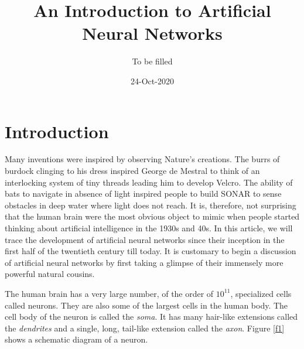 \documentclass{article}
\title{An Introduction to Artificial Neural Networks}
\author{To be filled}
\date{24-Oct-2020}
\numberwithin{equation}{section}
\begin{document}
\maketitle
\section{Introduction}\label{s1}
Many inventions were inspired by observing Nature's creations. The burrs of
burdock clinging to his dress inspired George de Mestral to think of an
interlocking system of tiny threads leading him to develop Velcro. The ability
of bats to navigate in absence of light inspired people to build SONAR to
sense obstacles in deep water where light does not reach. It is, therefore,
not surprising that the human brain were the most obvious object to mimic
when people started thinking about artificial intelligence in the 1930s and 40s.
In this article, we will trace the development of artificial neural networks
since their inception in the first half of the twentieth century till today.
It is customary to begin a discussion of artificial neural networks by first
taking a glimpse of their immensely more powerful natural cousins.

The human brain has a very large number, of the order of $10^{11}$, specialized
cells called neurons. They are also some of the largest cells in the human
body. The cell body of the neuron is called the \emph{soma}. It has many 
hair-like extensions called the \emph{dendrites} and a single, long, tail-like
extension called the \emph{axon}. Figure \ref{f1} shows a schematic diagram of
a neuron.
\end{document}
